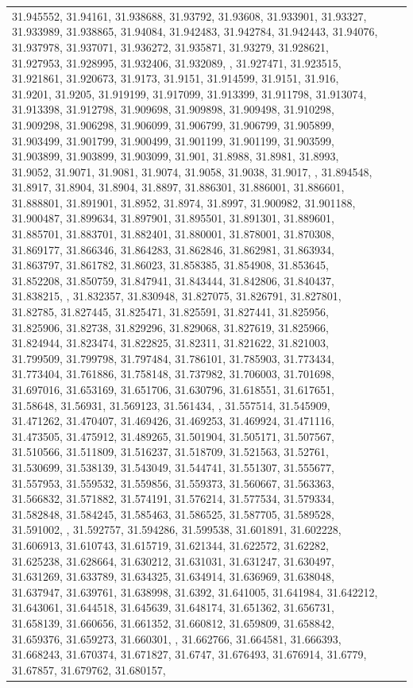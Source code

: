 \documentclass[
]{book}
\begin{document}
\begin{table}[ht]
\begin{centerbox}
\begin{threeparttable}
\begin{tabular}{l l l}
31.945552, 31.94161, 31.938688, 31.93792, 31.93608, 31.933901, 31.93327, 31.933989, 31.938865, 31.94084, 31.942483, 31.942784, 31.942443, 31.94076, 31.937978, 31.937071, 31.936272, 31.935871, 31.93279, 31.928621, 31.927953, 31.928995, 31.932406, 31.932089,  \newline 31.931417, 31.927471, 31.923515, 31.921861, 31.920673, 31.9173, 31.9151, 31.914599, 31.9151, 31.916, 31.9201, 31.9205, 31.919199, 31.917099, 31.913399, 31.911798, 31.913074, 31.913398, 31.912798, 31.909698, 31.909898, 31.909498, 31.910298, 31.909298, 31.906298, 31.906099, 31.906799, 31.906799, 31.905899, 31.903499, 31.901799, 31.900499, 31.901199, 31.901199, 31.903599, 31.903899, 31.903899, 31.903099, 31.901, 31.8988, 31.8981, 31.8993, 31.9052, 31.9071, 31.9081, 31.9074, 31.9058, 31.9038, 31.9017,  \newline 31.897408, 31.894548, 31.8917, 31.8904, 31.8904, 31.8897, 31.886301, 31.886001, 31.886601, 31.888801, 31.891901, 31.8952, 31.8974, 31.8997, 31.900982, 31.901188, 31.900487, 31.899634, 31.897901, 31.895501, 31.891301, 31.889601, 31.885701, 31.883701, 31.882401, 31.880001, 31.878001, 31.870308, 31.869177, 31.866346, 31.864283, 31.862846, 31.862981, 31.863934, 31.863797, 31.861782, 31.86023, 31.858385, 31.854908, 31.853645, 31.852208, 31.850759, 31.847941, 31.843444, 31.842806, 31.840437, 31.838215,  \newline 31.834523, 31.832357, 31.830948, 31.827075, 31.826791, 31.827801, 31.82785, 31.827445, 31.825471, 31.825591, 31.827441, 31.825956, 31.825906, 31.82738, 31.829296, 31.829068, 31.827619, 31.825966, 31.824944, 31.823474, 31.822825, 31.82311, 31.821622, 31.821003, 31.799509, 31.799798, 31.797484, 31.786101, 31.785903, 31.773434, 31.773404, 31.761886, 31.758148, 31.737982, 31.706003, 31.701698, 31.697016, 31.653169, 31.651706, 31.630796, 31.618551, 31.617651, 31.58648, 31.56931, 31.569123, 31.561434,  \newline 31.557308, 31.557514, 31.545909, 31.471262, 31.470407, 31.469426, 31.469253, 31.469924, 31.471116, 31.473505, 31.475912, 31.489265, 31.501904, 31.505171, 31.507567, 31.510566, 31.511809, 31.516237, 31.518709, 31.521563, 31.52761, 31.530699, 31.538139, 31.543049, 31.544741, 31.551307, 31.555677, 31.557953, 31.559532, 31.559856, 31.559373, 31.560667, 31.563363, 31.566832, 31.571882, 31.574191, 31.576214, 31.577534, 31.579334, 31.582848, 31.584245, 31.585463, 31.586525, 31.587705, 31.589528, 31.591002,  \newline 31.591842, 31.592757, 31.594286, 31.599538, 31.601891, 31.602228, 31.606913, 31.610743, 31.615719, 31.621344, 31.622572, 31.62282, 31.625238, 31.628664, 31.630212, 31.631031, 31.631247, 31.630497, 31.631269, 31.633789, 31.634325, 31.634914, 31.636969, 31.638048, 31.637947, 31.639761, 31.638998, 31.6392, 31.641005, 31.641984, 31.642212, 31.643061, 31.644518, 31.645639, 31.648174, 31.651362, 31.656731, 31.658139, 31.660656, 31.661352, 31.660812, 31.659809, 31.658842, 31.659376, 31.659273, 31.660301,  \newline 31.661381, 31.662766, 31.664581, 31.666393, 31.668243, 31.670374, 31.671827, 31.6747, 31.676493, 31.676914, 31.6779, 31.67857, 31.679762, 31.680157, 
\end{tabular}
\end{threeparttable}
\end{centerbox}
\end{table}
\end{document}
